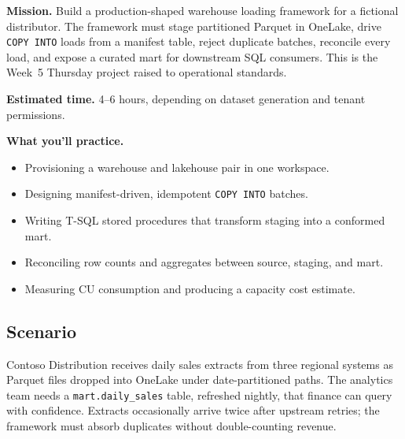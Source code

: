 \begin{capstonebox}
\textbf{Mission.} Build a production-shaped warehouse loading framework for a fictional distributor. The framework must stage partitioned Parquet in OneLake, drive \texttt{COPY INTO} loads from a manifest table, reject duplicate batches, reconcile every load, and expose a curated mart for downstream SQL consumers. This is the Week~5 Thursday project raised to operational standards.

\textbf{Estimated time.} 4--6 hours, depending on dataset generation and tenant permissions.

\textbf{What you'll practice.}
\begin{itemize}
    \item Provisioning a warehouse and lakehouse pair in one workspace.
    \item Designing manifest-driven, idempotent \texttt{COPY INTO} batches.
    \item Writing T-SQL stored procedures that transform staging into a conformed mart.
    \item Reconciling row counts and aggregates between source, staging, and mart.
    \item Measuring CU consumption and producing a capacity cost estimate.
\end{itemize}
\end{capstonebox}

\subsection*{Scenario}
Contoso Distribution receives daily sales extracts from three regional systems as Parquet files dropped into OneLake under date-partitioned paths. The analytics team needs a \texttt{mart.daily\_sales} table, refreshed nightly, that finance can query with confidence. Extracts occasionally arrive twice after upstream retries; the framework must absorb duplicates without double-counting revenue.

